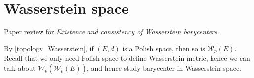 \chapter{Wasserstein space}

Paper review for \emph{Existence and consistency of Wasserstein barycenters}\cite{le2017existence}.

By \cref{topology_Wasserstein}, if $(E,d)$ is a Polish space, then so is $\mathcal{W}_p(E)$. Recall that we only need Polish space to define Wasserstein metric, hence we can talk about $\mathcal{W}_p(\mathcal{W}_p(E))$, and hence study barycenter in Wasserstein space.


